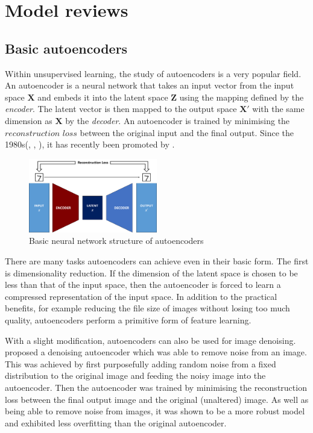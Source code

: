 \chapter{Model reviews} \label{ch:model_reviews}
    \section{Basic autoencoders}
        Within unsupervised learning, the study of autoencoders is a very popular field. An autoencoder is a neural network that takes an input vector from the input space $\bm{X}$ and embeds it into the latent space $\bm{Z}$ using the mapping defined by the \textit{encoder}. The latent vector is then mapped to the output space $\bm{X'}$ with the same dimension as $\bm{X}$ by the \textit{decoder}. An autoencoder is trained by minimising the $\textit{reconstruction loss}$ between the original input and the final output. Since the 1980s(\cite{yann1987modeles}, \cite{bourlard1988auto}, \cite{hinton1994autoencoders}), it has recently been promoted by \cite{HintonSalakhutdinov2006b}.
        
        \begin{figure}[H]
            \centering
            \includegraphics[width=0.5\textwidth]{imgs/autoencoder.png}
            \caption{Basic neural network structure of autoencoders}
            \label{fig:ae}
        \end{figure}
        
        There are many tasks autoencoders can achieve even in their basic form. The first is dimensionality reduction. If the dimension of the latent space is chosen to be less than that of the input space, then the autoencoder is forced to learn a compressed representation of the input space. In addition to the practical benefits, for example reducing the file size of images without losing too much quality, autoencoders perform a primitive form of feature learning.
        
        With a slight modification, autoencoders can also be used for image denoising. \cite{vincent2008extracting} proposed a denoising autoencoder which was able to remove noise from an image. This was achieved by first purposefully adding random noise from a fixed distribution to the original image and feeding the noisy image into the autoencoder. Then the autoencoder was trained by minimising the reconstruction loss between the final output image and the original (unaltered) image. As well as being able to remove noise from images, it was shown to be a more robust model and exhibited less overfitting than the original autoencoder.
        
